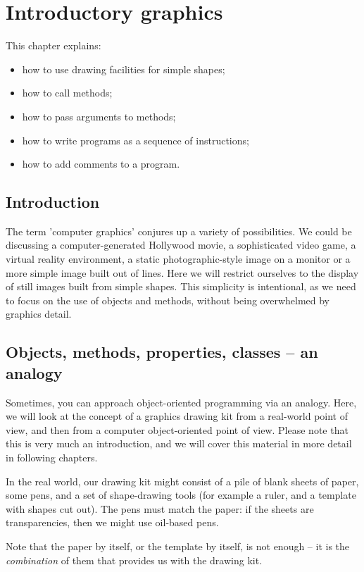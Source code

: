 \chapter{Introductory graphics}
\label{ch:graphics-intro}

	This chapter explains:
	\begin{itemize}
		\item how to use drawing facilities for simple shapes;
		\item how to call methods;
		\item how to pass arguments to methods;
		\item how to write programs as a sequence of instructions;
		\item how to add comments to a program.
	\end{itemize}

	\section{Introduction}
		The term 'computer graphics' conjures up a variety of possibilities. We could be discussing a computer-generated Hollywood movie, a sophisticated video game, a virtual reality environment, a static photographic-style image on a monitor or a more simple image built out of lines. Here we will restrict ourselves to the display of still images built from simple shapes. This simplicity is intentional, as we need to focus on the use of objects and methods, without being overwhelmed by graphics detail.

	\section{Objects, methods, properties, classes – an analogy}
		Sometimes, you can approach object-oriented programming via an analogy. Here, we will look at the concept of a graphics drawing kit from a real-world point of view, and then from a computer object-oriented point of view. Please note that this is very much an introduction, and we will cover this material in more detail in following
chapters.
		
		In the real world, our drawing kit might consist of a pile of blank sheets of paper, some pens, and a set of shape-drawing tools (for example a ruler, and a template with shapes cut out). The pens must match the paper: if the sheets are transparencies, then we might use oil-based pens.
		
		Note that the paper by itself, or the template by itself, is not enough – it is the \emph{combination} of them that provides us with the drawing kit.

